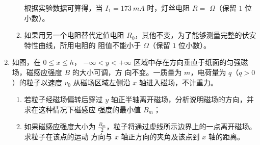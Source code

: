 \begin{enumerate}
\begin{enumerate}
根据实验数据可算得，当 $ I_{1} =173 \ mA $ 时，灯丝电阻 $ R=$ \underlinegap $ \Omega $（保留 $ 1 $ 位小数）。


\item 
如果用另一个电阻替代定值电阻 $ R_{0} $，其他不变，为了能够测量完整的伏安特性曲线，所用电阻的
阻值不能小于 \underlinegap $ \Omega $（保留 $ 1 $ 位小数）。

\end{enumerate}




\newpage

\gaokaojs

\item
如图，在 $ 0 \leq x \leq h $， $ - \infty <y<+ \infty$ 区域中存在方向垂直于纸面的匀强磁场，磁感应强度 $ B $ 的大小可调，方
向不变。一质量为 $ m $，电荷量为 $ q $（$ q>0 $）的粒子以速度 $ v_{0} $ 从磁场区域左侧沿 $ x $ 轴进入磁场，不计重力。
\begin{enumerate}
\item
若粒子经磁场偏转后穿过 $ y $ 轴正半轴离开磁场，分析说明磁场的方向，并求在这种情况下磁感应
强度的最小值 $ B_{m} $；
\item 
如果磁感应强度大小为
$\frac{B_{m}}{2}$，粒子将通过虚线所示边界上的一点离开磁场。求粒子在该点的运动
方向与 $ x $ 轴正方向的夹角及该点到 $ x $ 轴的距离。

\end{enumerate}
\begin{figure}[h!]
\flushright

\end{figure}



\end{enumerate}
